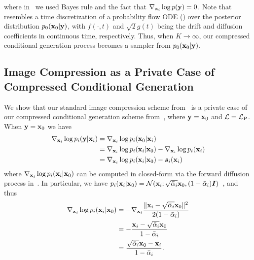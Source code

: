 where in~ we used Bayes rule and the fact that $\nabla_{{\mathbf{x}}_{i}}\log{p({\mathbf{y}})}=0$.
Note that~ resembles a time discretization of a probability flow ODE () over the posterior distribution $p_{0}({\mathbf{x}}_{0}|{\mathbf{y}})$, with $f(\cdot,t)$ and $\sqrt{2}g(t)$ being the drift and diffusion coefficients in continuous time, respectively.
Thus, when $K\rightarrow\infty$, our compressed conditional generation process becomes a sampler from $p_{0}({\mathbf{x}}_{0}|{\mathbf{y}})$.


\subsection{Image Compression as a Private Case of Compressed Conditional Generation}\label{appendix:compression_private_case}
We show that our standard image compression scheme from~ is a private case of our compressed conditional generation scheme from~, where ${\mathbf{y}}={\mathbf{x}}_{0}$ and ${\mathcal{L}}={\mathcal{L}}_{\text{P}}$.
When ${\mathbf{y}}={\mathbf{x}}_{0}$ we have
\begin{align}
    \nabla_{{\mathbf{x}}_{i}}\log{p_{i}({\mathbf{y}}|{\mathbf{x}}_{i})}&=\nabla_{{\mathbf{x}}_{i}}\log{p_{i}({\mathbf{x}}_{0}|{\mathbf{x}}_{i})}\nonumber\\
    &=\nabla_{{\mathbf{x}}_{i}}\log{p_{i}({\mathbf{x}}_{i}|{\mathbf{x}}_{0})}-\nabla_{{\mathbf{x}}_{i}}\log{p_{i}({\mathbf{x}}_{i})}\\
    &=\nabla_{{\mathbf{x}}_{i}}\log{p_{i}({\mathbf{x}}_{i}|{\mathbf{x}}_{0})}-{\bm{s}}_{i}({\mathbf{x}}_{i})\label{eq:compression-grad}
\end{align}
where $\nabla_{{\mathbf{x}}_{i}}\log{p_{i}({\mathbf{x}}_{i}|{\mathbf{x}}_{0})}$ can be computed in closed-form via the forward diffusion process in~.
In particular, we have $p_{i}({\mathbf{x}}_{i}|{\mathbf{x}}_{0})={\mathcal{N}}({\mathbf{x}}_{i};\sqrt{\bar{\alpha}_{i}}{\mathbf{x}}_{0},(1-\bar{\alpha}_{i}){\bm{I}})$~\citep{ho2020denoising}, and thus
\begin{align}
    \nabla_{{\mathbf{x}}_{i}}\log{p_{i}({\mathbf{x}}_{i}|{\mathbf{x}}_{0})}&=-\nabla_{{\mathbf{x}}_{i}}\frac{\lVert{\mathbf{x}}_{i}-\sqrt{\bar{\alpha}_{i}}{\mathbf{x}}_{0}\rVert^{2}}{2(1-\bar{\alpha}_{i})}\\
    &=-\frac{{\mathbf{x}}_{i}-\sqrt{\bar{\alpha}_{i}}{\mathbf{x}}_{0}}{1-\bar{\alpha}_{i}}\\
    &=\frac{\sqrt{\bar{\alpha}_{i}}{\mathbf{x}}_{0}-{\mathbf{x}}_{i}}{1-\bar{\alpha}_{i}}.\label{eq:vp-sde-forward-grad}
\end{align}
